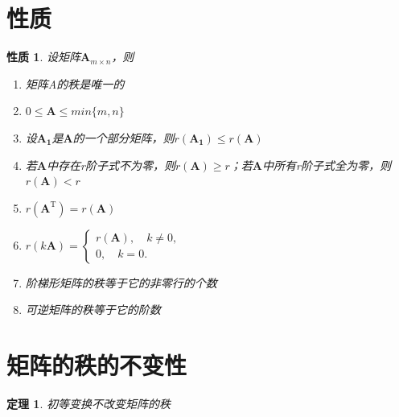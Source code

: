 \documentclass[12pt,oneside]{ctexbook}
\newtheorem{theorem}[subsection]{定理}
\newtheorem{property}[subsection]{性质}
\begin{document}
\section{性质}
\begin{property}
    设矩阵\(\mathbf{A}_{m \times n}\)，则
    \begin{enumerate}
        \item 矩阵A的秩是唯一的
        \item \(0\leq \mathbf{A} \leq min\{m,n\}\)
        \item 设\(\mathbf{A_1}\)是\(\mathbf{A}\)的一个部分矩阵，则\(r(\mathbf{A_1}) \leq r(\mathbf{A})\)
        \item 若\(\mathbf{A}\)中存在r阶子式不为零，则\(r(\mathbf{A}) \geq r\)；若\(\mathbf{A}\)中所有r阶子式全为零，则\(r(\mathbf{A})<r\)
        \item \(r(\mathbf{A}^\mathrm{T})=r(\mathbf{A})\)
        \item \(r(k\mathbf{A})=\begin{cases}
            r(\mathbf{A}),\quad k \neq 0,
            \\0,\quad k=0.
        \end{cases}\)
        \item 阶梯形矩阵的秩等于它的非零行的个数
        \item 可逆矩阵的秩等于它的阶数
    \end{enumerate}
\end{property}

\section{矩阵的秩的不变性}
\begin{theorem}
    初等变换不改变矩阵的秩
\end{theorem}
\end{document}
